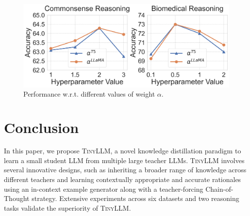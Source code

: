 \documentclass[sigconf,nonacm]{acmart}
\newcommand{\ours}{\textsc{TinyLLM}\xspace}
\begin{document}
\begin{figure}[t]
  \centering
  \includegraphics[width=\columnwidth]{Figures/param_sen.png}
  \vspace{-0.25in}
  \caption{Performance w.r.t. different values of weight $\alpha$.}
  \vspace{-0.15in}
  \label{fig:sensitivity}
\end{figure}


\vspace{-0.05in}
\section{Conclusion}
In this paper, we propose \ours, a novel knowledge distillation paradigm to learn a small student LLM from multiple large teacher LLMs. \ours involves several innovative designs, such as inheriting a broader range of knowledge across different teachers and learning contextually appropriate and accurate rationales using an in-context example generator along with a teacher-forcing Chain-of-Thought strategy. Extensive experiments across six datasets and two reasoning tasks validate the superiority of \ours.





\end{document}
